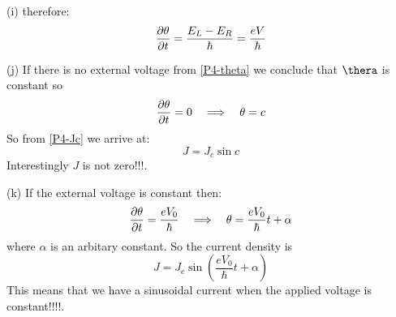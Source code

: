 \begin{homeworkProblem}
\begin{homeworkSection}{(i)}
therefore:
\begin{equation}\label{P4-theta}
\dfrac{\partial \theta}{\partial t}=\frac{E_L-E_R}{\hbar}=\frac{eV}{\hbar}
\end{equation}
\end{homeworkSection}
\begin{homeworkSection}{(j)}
If there is no external voltage from \eqref{P4-theta} we conclude that $\thera$ is constant so 
\begin{equation}
\dfrac{\partial \theta}{\partial t}=0\quad\Longrightarrow\quad \theta=c
\end{equation}
So from \eqref{P4-Jc} we arrive at:
\begin{equation}
J=J_c\sin c
\end{equation}
Interestingly $J$ is not zero!!!.
\end{homeworkSection}
\begin{homeworkSection}{(k)}
If the external voltage is constant then:
\begin{equation}
\dfrac{\partial \theta}{\partial t}=\frac{eV_0}{\hbar}\quad\Longrightarrow\quad \theta=\frac{eV_0}{\hbar}t+\alpha
\end{equation}
where $\alpha$ is an arbitary constant. So the current density is
\begin{equation}
J=J_c\sin\left(\frac{eV_0}{\hbar}t+\alpha\right)
\end{equation}
This means that we have a sinusoidal current when the applied voltage is constant!!!!.

\end{homeworkSection}
\end{homeworkProblem}